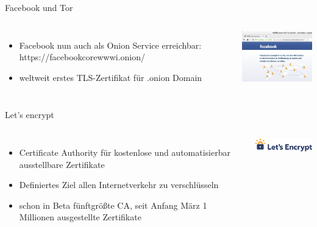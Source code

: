 \documentclass[12pt, xcolor={svgnames,table}]{beamer}
\begin{document}
\begin{frame}{Facebook und Tor}
  \begin{columns}
    \column{5.5cm}
    \footnotesize

    \begin{itemize}
      \item Facebook nun auch als Onion Service erreichbar: https://facebookcorewwwi.onion/
      \item weltweit erstes TLS-Zertifikat für .onion Domain
    \end{itemize}

    \column{5cm}

    \begin{center}
      \includegraphics[width=4.5cm]{img/tor-facebook.png}
    \par\end{center}
  \end{columns}
\end{frame}

\begin{frame}{Let's encrypt}
  \begin{columns}
    \column{5.5cm}
    \footnotesize

    \begin{itemize}
      \item Certificate Authority für kostenlose und automatisierbar ausstellbare Zertifikate
      \item Definiertes Ziel allen Internetverkehr zu verschlüsseln
      \item schon in Beta fünftgrößte CA, seit Anfang März 1 Millionen ausgestellte Zertifikate
    \end{itemize}

    \column{5cm}

    \begin{center}
      \includegraphics[width=3.5cm]{img/letsencrypt}
    \par\end{center}
  \end{columns}
\end{frame}
\end{document}
